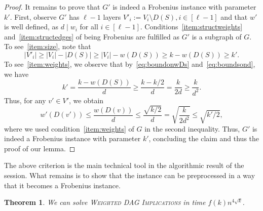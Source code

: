 \documentclass[10pt,a4paper]{article}
\newtheorem{thm}{Theorem}[section]
\newcommand{\wDAGImplication}{\textsc{Weighted DAG Implications}\xspace}
\newcommand{\divides}{\mid}
\begin{document}
\begin{proof}
%
It remains to prove that $G'$ is indeed a Frobenius instance with parameter $k'$. First, observe $G'$ has $\ell-1$ layers $V'_i := V_i \setminus D(S), i\in [\ell-1]$ and that $w'$ is well defined, as $d\divides w_i$ for all $i\in [\ell-1]$. Conditions~\ref{item:structweights} and~\ref{item:structedges} of being Frobenius are fulfilled as $G'$ is a subgraph of $G$. To see~\ref{item:size}, note that 
\[ |V'_i| \ge |V_i| - |D(S)| \ge |V_i|- w(D(S)) \ge k-w(D(S)) \ge k'. \]
To see~\ref{item:weights}, we observe that by~\eqref{eq:boundonwDs} and~\eqref{eq:boundsond}, we have
\[ k' = \frac{k-w(D(S))}{d} \ge \frac{k-k/2}{d} = \frac{k}{2d} \ge \frac{k}{d^2}. \]
Thus, for any $v'\in V'$, we obtain
\[ w'(D(v')) \le \frac{w(D(v))}{d} \le \frac{\sqrt{k/2}}{d} = \sqrt{\frac{k}{2d^2}} \le \sqrt{k'/2}, \]
where we used condition~\ref{item:weights} of $G$ in the second inequality. Thus, $G'$ is indeed a Frobenius instance with parameter $k'$, concluding the claim and thus the proof of our lemma.
\end{proof}
%
%
The above criterion is the main technical tool in the algorithmic result of the session. What remains is to show that the instance can be preprocessed in a way that it becomes a Frobenius instance.
\begin{thm}\label{thm:implalgo}
We can solve \wDAGImplication in time $f(k)n^{4\sqrt{k}}$.
\end{thm}
\end{document}
